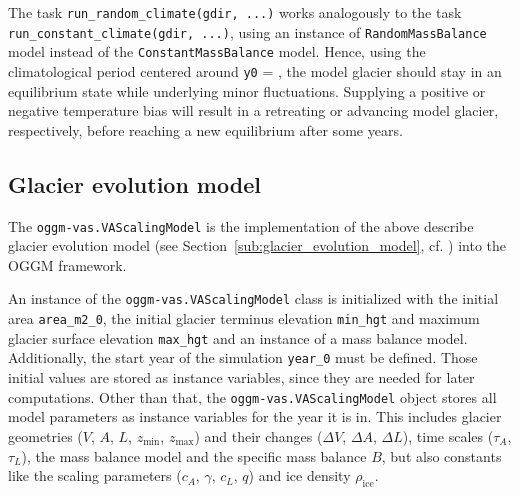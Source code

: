             The task \lstinline`run_random_climate(gdir, ...)` works analogously to the task \lstinline`run_constant_climate(gdir, ...)`, using an instance of \lstinline`RandomMassBalance` model instead of the \lstinline`ConstantMassBalance` model. Hence, using the climatological period centered around \lstinline`y0` = \tstar, the model glacier should stay in an equilibrium state while underlying minor fluctuations. Supplying a positive or negative temperature bias will result in a retreating or advancing model glacier, respectively, before reaching a new equilibrium after some years.
        
    

    \subsection{Glacier evolution model} %
    \label{sub:glacier_evolution_model_implementation}

        The \lstinline`oggm-vas.VAScalingModel` is the implementation of the above describe glacier evolution model (see Section~\ref{sub:glacier_evolution_model}, cf. \citet{Marzeion2012b}) into the OGGM framework.

        An instance of the \lstinline`oggm-vas.VAScalingModel` class is initialized with the initial area \lstinline`area_m2_0`, the initial glacier terminus elevation \lstinline`min_hgt` and maximum glacier surface elevation \lstinline`max_hgt` and an instance of a mass balance model. Additionally, the start year of the simulation \lstinline`year_0` must be defined. Those initial values are stored as instance variables, since they are needed for later computations. Other than that, the \lstinline`oggm-vas.VAScalingModel` object stores all model parameters as instance variables for the year it is in. This includes glacier geometries ($V$, $A$, $L$, $z_\text{min}$, $z_\text{max}$) and their changes ($\Delta V$, $\Delta A$, $\Delta L$), time scales ($\tau_A$, $\tau_L$), the mass balance model and the specific mass balance $B$, but also constants like the scaling parameters ($c_A$, $\gamma$, $c_L$, $q$) and ice density $\rho_\text{ice}$.

